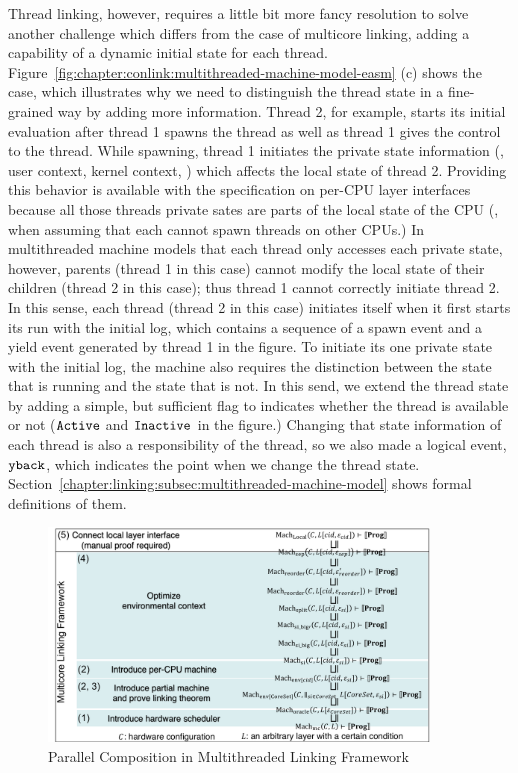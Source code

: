 Thread linking, however, requires a little bit more fancy resolution to solve another challenge which differs from the case of multicore linking, adding a capability of a dynamic initial state for each thread.
Figure~\ref{fig:chapter:conlink:multithreaded-machine-model-easm} (c) 
shows the case, which illustrates why we need to distinguish the thread state in a fine-grained way by adding more information. 
Thread 2, for example, starts its initial evaluation after thread 1 spawns the thread as well as thread 1 gives the control to the thread. 
While spawning, thread 1 initiates the private state information (\eg, user context, kernel context, \etc) which affects the local state of thread 2. 
Providing this behavior is available with the specification on per-CPU layer interfaces because all those threads private sates are parts of the local state of the CPU (\ie, when assuming that each cannot spawn threads on other CPUs.)
In multithreaded machine models that each thread only accesses each private state, however, 
parents (thread 1 in this case) cannot modify the local state of their children (thread 2 in this case); thus thread 1 cannot correctly initiate thread 2.
In this sense,
each thread (thread 2 in this case) initiates itself when it first starts its run with the initial log,
which contains a sequence of a spawn event and a yield event generated by thread 1 in the figure. 
To initiate its one private state with the initial log, 
the machine also requires the distinction between the state that is running and the state that is not.
In this send, we extend the thread state by adding a simple, but sufficient flag to indicates whether the thread is available or not (${\mathrm{\texttt{Active}}}$ and ${\mathrm{\texttt{Inactive}}}$ in the figure.)
Changing that state information of each thread is also a responsibility of the thread,
so we also made a logical event, ${\mathrm{\texttt{yback}}}$, which indicates the point when we change the thread state.
Section~\ref{chapter:linking:subsec:multithreaded-machine-model} shows formal definitions of them. 

\begin{figure}
\begin{center}
\includegraphics[width=0.9\textwidth, page=6]{figs/conlink/concurrent_linking}
\end{center}
\caption{Parallel Composition in Multithreaded Linking Framework}
\label{fig:chapter:conlink:parallel-composition-in-easm}
\end{figure}

